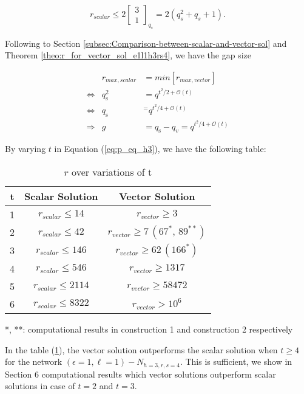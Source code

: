 \begin{equation}
r_{scalar}\leq2\left[\begin{array}{c}
3\\
1
\end{array}\right]_{q_{s}}=2\left(q_{s}^{2}+q_{s}+1\right).\label{eq:r_scalar_max}
\end{equation}
 

Following to Section \ref{subsec:Comparison-between-scalar-and-vector-sol}
and Theorem \ref{theo:r_for_vector_sol_e1l1h3rs4}, we have the gap
size 

\begin{eqnarray}
 & r_{max,scalar} & =min\left[r_{max,vector}\right]\nonumber \\
\Leftrightarrow & q_{\mathrm{s}}^{2} & =q^{t^{2}/2+\mathcal{O}(t)}\nonumber \\
\Leftrightarrow & q_{\mathrm{s}} & ^{=}q^{t^{2}/4+\mathcal{O}(t)}\nonumber \\
\Rightarrow & g & =q_{\mathrm{s}}-q_{v}=q^{t^{2}/4+\mathcal{O}(t)}\label{eq:gap_e1l1h3rs4}
\end{eqnarray}

By varying $t$ in Equation (\ref{eq:p_eq_h3}), we have the following
table:

\begin{table}[H]
\caption{$r$ over variations of t\label{tab:r_over_t}}

\begin{centering}
\begin{tabular}{|c|c|c|}
\hline 
t & Scalar Solution & Vector Solution\tabularnewline
\hline 
\hline 
1 & $r_{scalar}\leq14$ & $r_{vector}\geq3$\tabularnewline
\hline 
2 & $r_{scalar}\leq42$ & $r_{vector}\geq7\,\left(67^{*},\,89^{**}\right)$\tabularnewline
\hline 
3 & $r_{scalar}\leq146$ & $r_{vector}\geq62\,\left(166^{*}\right)$ \tabularnewline
\hline 
4 & $r_{scalar}\leq546$ & $r_{vector}\geq1317$\tabularnewline
\hline 
5 & $r_{scalar}\leq2114$ & $r_{vector}\geq58472$\tabularnewline
\hline 
6 & $r_{scalar}\leq8322$ & $r_{vector}>10^{6}$\tabularnewline
\hline 
\end{tabular}
\par\end{centering}
{*}, {*}{*}: computational results in construction 1 and construction
2 respectively
\end{table}

In the table (\ref{tab:r_over_t}), the vector solution outperforms
the scalar solution when $t\geq4$ for the network $\left(\epsilon=1,\ell=1\right)-\ensuremath{N}_{h=3,r,s=4}$.
This is sufficient, we show in Section 6 computational results which
vector solutions outperform scalar solutions in case of $t=2$ and
$t=3$.

